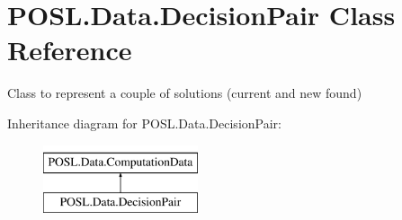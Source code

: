 \hypertarget{classPOSL_1_1Data_1_1DecisionPair}{}\section{P\+O\+S\+L.\+Data.\+Decision\+Pair Class Reference}
\label{classPOSL_1_1Data_1_1DecisionPair}


Class to represent a couple of solutions (current and new found)  


Inheritance diagram for P\+O\+S\+L.\+Data.\+Decision\+Pair\+:\begin{figure}[H]
\begin{center}
\leavevmode
\includegraphics[height=2.000000cm]{classPOSL_1_1Data_1_1DecisionPair}
\end{center}
\end{figure}
